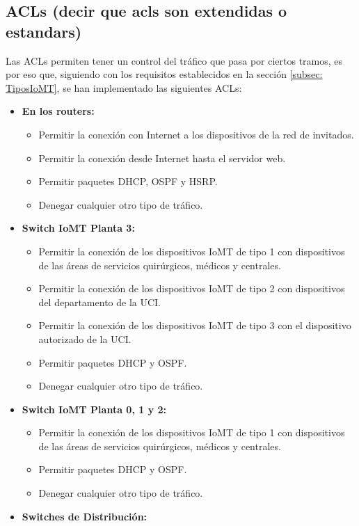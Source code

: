 \subsection{ACLs (decir que acls son extendidas o estandars)}\label{subsec:acls}
Las ACLs permiten tener un control del tráfico que pasa por ciertos tramos, es por eso que, siguiendo con los requisitos establecidos en la sección \ref{subsec: TiposIoMT}, se han implementado las siguientes ACLs:
\begin{itemize}
    \item \textbf{En los routers:} 
    \begin{itemize}
        \item Permitir la conexión con Internet a los dispositivos de la red de invitados.
        \item Permitir la conexión desde Internet hasta el servidor web.
        \item Permitir paquetes DHCP, OSPF y HSRP.
        \item Denegar cualquier otro tipo de tráfico.
    \end{itemize}
    \item \textbf{Switch IoMT Planta 3:}
    \begin{itemize}
        \item Permitir la conexión de los dispositivos IoMT de tipo 1 con dispositivos de las áreas de servicios quirúrgicos, médicos y centrales.
        \item Permitir la conexión de los dispositivos IoMT de tipo 2 con dispositivos del departamento de la UCI.
        \item Permitir la conexión de los dispositivos IoMT de tipo 3 con el dispositivo autorizado de la UCI.
        \item Permitir paquetes DHCP y OSPF.
        \item Denegar cualquier otro tipo de tráfico.
    \end{itemize}
    \item \textbf{Switch IoMT Planta 0, 1 y 2:}
    \begin{itemize}
        \item Permitir la conexión de los dispositivos IoMT de tipo 1 con dispositivos de las áreas de servicios quirúrgicos, médicos y centrales.
        \item Permitir paquetes DHCP y OSPF.
        \item Denegar cualquier otro tipo de tráfico.
    \end{itemize}
    \item \textbf{Switches de Distribución:}

\end{itemize}
